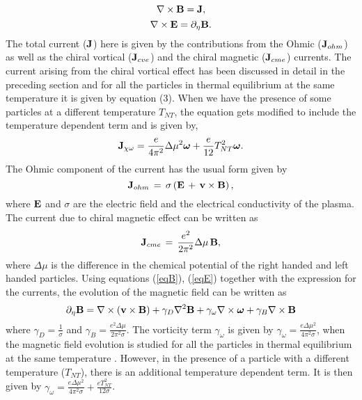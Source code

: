 \documentclass{ws-mpla}
\begin{document}
\begin{equation}
{\bf \nabla \times B} = {\bf J}, 
\label {eqB}
\end{equation}
\begin{equation}
 {\bf \nabla \times E} = \partial_\eta {\bf B}. 
 \label {eqE}
\end{equation}
The total current (${\bf J}$) here is given by the contributions from the Ohmic 
(${\bf {J}}_{ohm}$) as well as the chiral vortical (${\bf {J}}_{cve}$) 
and the chiral magnetic (${\bf {J}}_{cme}$) currents. The current arising from the chiral vortical effect has been discussed in
detail in the preceding section and for all the particles in thermal equilibrium at the same temperature it is given by \cite{tashiro} equation (3). 
When we have the presence of some particles at a different temperature $T_{NT}$, the equation gets modified to include the temperature dependent 
term and is given by, 
\begin{equation}
  {\bf{J}}_{\chi \omega} = \frac{e}{4 \pi^2} \Delta \mu^2 {\bm{\omega}} +  \frac{e}{12} T_{NT}^2 {\bm{\omega}} . 
\end{equation} 
The Ohmic component of the current has the usual form given by
\begin{equation}
	{\bf {J}}_{ohm} \, = \, \sigma \left( {\bf E} \, + \, {\bf v} \times {\bf B}  
\right),
\end{equation}
where ${\bf E}$ and $\sigma$ are the electric field and the electrical
	conductivity of the plasma. The current due to chiral magnetic effect can be written
as \cite{kharzeev}
\begin{equation}
	{\bf {J}}_{cme} \, = \, \frac{e^2}{2 \pi^2} \Delta \mu \, {\bf B},
\end{equation}
where $\Delta \mu$ is the difference in the chemical potential of the right
handed and left handed particles.
Using equations (\ref{eqB}), (\ref{eqE}) together with the expression for the
currents, the evolution  of the magnetic field can be written as
\begin{equation}
\label{mhd}
 \partial_\eta {\bf B} = {\bf \nabla} \times ({\bf v} \times {\bf B}) 
+ \gamma_D \nabla^2 {\bf B} + \gamma_{\omega} {\bf \nabla} \times {\bm\omega} 
+ \gamma_B {\bf \nabla} \times {\bf B} 
\end{equation}
where $ \gamma_D = \frac{1}{\sigma}$ and $ \gamma_B = \frac{e^2 \Delta\mu}{2 \pi^2 \sigma}$.
The vorticity term $\gamma_\omega$ is given by $\gamma_\omega = \frac{e \Delta \mu^2}{4 \pi^2 \sigma}$, when the magnetic field evolution is studied for all 
the particles in thermal equilibrium at the same temperature  \cite{tashiro}. However, in the presence of a particle with a different temperature ($T_{NT}$), 
there is an additional temperature dependent term.  It is then given by $\gamma_\omega = \frac{e \Delta \mu^2}{4 \pi^2 \sigma} + \frac{eT_{NT}^2}{12 \sigma}$. 
\end{document}
